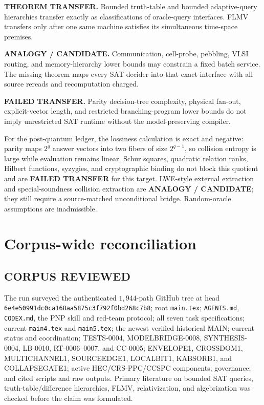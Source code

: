 \documentclass[11pt]{article}
\begin{document}
\begin{description}[leftmargin=0cm,labelwidth=0cm]
\item[] \textbf{THEOREM TRANSFER.}
Bounded truth-table and bounded adaptive-query hierarchies transfer exactly
as classifications of oracle-query interfaces.  FLMV transfers only after
one same machine satisfies its simultaneous time-space premises.
\item[] \textbf{ANALOGY / CANDIDATE.}
Communication, cell-probe, pebbling, VLSI routing, and memory-hierarchy lower
bounds may constrain a fixed batch service.  The missing theorem maps every
SAT decider into that exact interface with all source rereads and recomputation
charged.
\item[] \textbf{FAILED TRANSFER.}
Parity decision-tree complexity, physical fan-out, explicit-vector length,
and restricted branching-program lower bounds do not imply unrestricted SAT
runtime without the model-preserving compiler.
\end{description}

For the post-quantum ledger, the lossiness calculation is exact and negative:
parity maps $2^q$ answer vectors into two fibers of size $2^{q-1}$, so collision
entropy is large while evaluation remains linear.  Schur squares, quadratic
relation ranks, Hilbert functions, syzygies, and cryptographic binding do not
block this quotient and are \textbf{FAILED TRANSFER} for this target.
LWE-style external extraction and special-soundness collision extraction are
\textbf{ANALOGY / CANDIDATE}; they still require a source-matched unconditional
bridge.  Random-oracle assumptions are inadmissible.

\section{Corpus-wide reconciliation}

\subsection*{CORPUS REVIEWED}
The run surveyed the authenticated $1{,}944$-path GitHub tree at head
\nolinkurl{6e4e50991dc0ca168aa5875c3f792f0bd268c7b8}; root \texttt{main.tex};
\texttt{AGENTS.md}, \texttt{CODEX.md}, the PNP skill and red-team protocol;
all seven task specifications; current \texttt{main4.tex} and
\texttt{main5.tex}; the newest verified historical MAIN; current status and
coordination; TESTS-0004, MODELBRIDGE-0008, SYNTHESIS-0004, LB-0010,
RT-0006--0007, and CC-0005; ENVELOPE1, CROSSDOM1, MULTICHANNEL1, SOURCEEDGE1,
LOCALBIT1, KABSORB1, and COLLAPSEGATE1; active HEC/CRS-PPC/CCSPC components;
governance; and cited scripts and raw outputs.  Primary literature on bounded
SAT queries, truth-table/difference hierarchies, FLMV, relativization, and
algebrization was checked before the claim was formulated.
\end{document}
